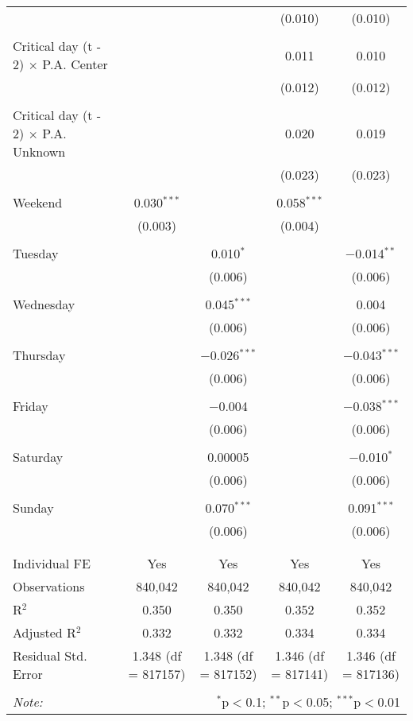 \documentclass[
]{article}
\begin{document}
\begin{table}[!htbp]
{\begin{tabular}{@{\extracolsep{5pt}}lcccc}
  &  &  & (0.010) & (0.010) \\ 
  & & & & \\ 
 Critical day (t - 2) $\times$ P.A. Center &  &  & 0.011 & 0.010 \\ 
  &  &  & (0.012) & (0.012) \\ 
  & & & & \\ 
 Critical day (t - 2) $\times$ P.A. Unknown &  &  & 0.020 & 0.019 \\ 
  &  &  & (0.023) & (0.023) \\ 
  & & & & \\ 
 Weekend & 0.030$^{***}$ &  & 0.058$^{***}$ &  \\ 
  & (0.003) &  & (0.004) &  \\ 
  & & & & \\ 
 Tuesday &  & 0.010$^{*}$ &  & $-$0.014$^{**}$ \\ 
  &  & (0.006) &  & (0.006) \\ 
  & & & & \\ 
 Wednesday &  & 0.045$^{***}$ &  & 0.004 \\ 
  &  & (0.006) &  & (0.006) \\ 
  & & & & \\ 
 Thursday &  & $-$0.026$^{***}$ &  & $-$0.043$^{***}$ \\ 
  &  & (0.006) &  & (0.006) \\ 
  & & & & \\ 
 Friday &  & $-$0.004 &  & $-$0.038$^{***}$ \\ 
  &  & (0.006) &  & (0.006) \\ 
  & & & & \\ 
 Saturday &  & 0.00005 &  & $-$0.010$^{*}$ \\ 
  &  & (0.006) &  & (0.006) \\ 
  & & & & \\ 
 Sunday &  & 0.070$^{***}$ &  & 0.091$^{***}$ \\ 
  &  & (0.006) &  & (0.006) \\ 
  & & & & \\ 
\hline \\[-1.8ex] 
Individual FE & Yes & Yes & Yes & Yes \\ 
Observations & 840,042 & 840,042 & 840,042 & 840,042 \\ 
R$^{2}$ & 0.350 & 0.350 & 0.352 & 0.352 \\ 
Adjusted R$^{2}$ & 0.332 & 0.332 & 0.334 & 0.334 \\ 
Residual Std. Error & 1.348 (df = 817157) & 1.348 (df = 817152) & 1.346 (df = 817141) & 1.346 (df = 817136) \\ 
\hline 
\hline \\[-1.8ex] 
\textit{Note:}  & \multicolumn{4}{r}{$^{*}$p$<$0.1; $^{**}$p$<$0.05; $^{***}$p$<$0.01} \\ 
\end{tabular}
} 
\end{table} 
\newpage
\end{document}
